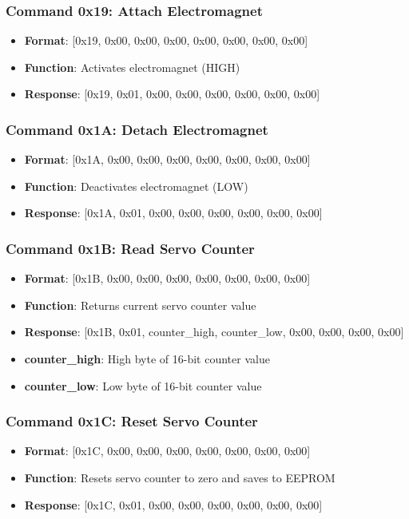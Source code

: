 \documentclass[11pt,a4paper]{article}
\begin{document}
\subsubsection{Command 0x19: Attach Electromagnet}
\begin{itemize}
    \item \textbf{Format}: [0x19, 0x00, 0x00, 0x00, 0x00, 0x00, 0x00, 0x00]
    \item \textbf{Function}: Activates electromagnet (HIGH)
    \item \textbf{Response}: [0x19, 0x01, 0x00, 0x00, 0x00, 0x00, 0x00, 0x00]
\end{itemize}

\subsubsection{Command 0x1A: Detach Electromagnet}
\begin{itemize}
    \item \textbf{Format}: [0x1A, 0x00, 0x00, 0x00, 0x00, 0x00, 0x00, 0x00]
    \item \textbf{Function}: Deactivates electromagnet (LOW)
    \item \textbf{Response}: [0x1A, 0x01, 0x00, 0x00, 0x00, 0x00, 0x00, 0x00]
\end{itemize}

\subsubsection{Command 0x1B: Read Servo Counter}
\begin{itemize}
    \item \textbf{Format}: [0x1B, 0x00, 0x00, 0x00, 0x00, 0x00, 0x00, 0x00]
    \item \textbf{Function}: Returns current servo counter value
    \item \textbf{Response}: [0x1B, 0x01, counter\_high, counter\_low, 0x00, 0x00, 0x00, 0x00]
    \item \textbf{counter\_high}: High byte of 16-bit counter value
    \item \textbf{counter\_low}: Low byte of 16-bit counter value
\end{itemize}

\subsubsection{Command 0x1C: Reset Servo Counter}
\begin{itemize}
    \item \textbf{Format}: [0x1C, 0x00, 0x00, 0x00, 0x00, 0x00, 0x00, 0x00]
    \item \textbf{Function}: Resets servo counter to zero and saves to EEPROM
    \item \textbf{Response}: [0x1C, 0x01, 0x00, 0x00, 0x00, 0x00, 0x00, 0x00]
\end{itemize}
\end{document}
